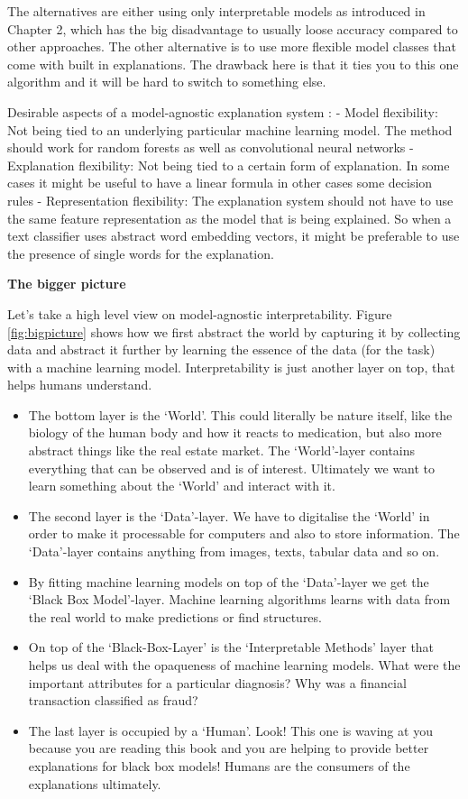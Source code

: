 \documentclass[12pt,]{krantz}
\providecommand{\tightlist}{%
  \setlength{\itemsep}{0pt}\setlength{\parskip}{0pt}}
\theoremstyle{definition}
\theoremstyle{definition}
\theoremstyle{definition}
\theoremstyle{remark}
\begin{document}
The alternatives are either using only interpretable models as
introduced in Chapter 2, which has the big disadvantage to usually loose
accuracy compared to other approaches. The other alternative is to use
more flexible model classes that come with built in explanations. The
drawback here is that it ties you to this one algorithm and it will be
hard to switch to something else.

Desirable aspects of a model-agnostic explanation system
\citep{Ribeiro2016b}: - Model flexibility: Not being tied to an
underlying particular machine learning model. The method should work for
random forests as well as convolutional neural networks - Explanation
flexibility: Not being tied to a certain form of explanation. In some
cases it might be useful to have a linear formula in other cases some
decision rules - Representation flexibility: The explanation system
should not have to use the same feature representation as the model that
is being explained. So when a text classifier uses abstract word
embedding vectors, it might be preferable to use the presence of single
words for the explanation.

\textbf{The bigger picture}

Let's take a high level view on model-agnostic interpretability. Figure
\ref{fig:bigpicture} shows how we first abstract the world by capturing
it by collecting data and abstract it further by learning the essence of
the data (for the task) with a machine learning model. Interpretability
is just another layer on top, that helps humans understand.

\begin{itemize}
\tightlist
\item
  The bottom layer is the `World'. This could literally be nature
  itself, like the biology of the human body and how it reacts to
  medication, but also more abstract things like the real estate market.
  The `World'-layer contains everything that can be observed and is of
  interest. Ultimately we want to learn something about the `World' and
  interact with it.
\item
  The second layer is the `Data'-layer. We have to digitalise the
  `World' in order to make it processable for computers and also to
  store information. The `Data'-layer contains anything from images,
  texts, tabular data and so on.
\item
  By fitting machine learning models on top of the `Data'-layer we get
  the `Black Box Model'-layer. Machine learning algorithms learns with
  data from the real world to make predictions or find structures.
\item
  On top of the `Black-Box-Layer' is the `Interpretable Methods' layer
  that helps us deal with the opaqueness of machine learning models.
  What were the important attributes for a particular diagnosis? Why was
  a financial transaction classified as fraud?
\item
  The last layer is occupied by a `Human'. Look! This one is waving at
  you because you are reading this book and you are helping to provide
  better explanations for black box models! Humans are the consumers of
  the explanations ultimately.
\end{itemize}
\end{document}
